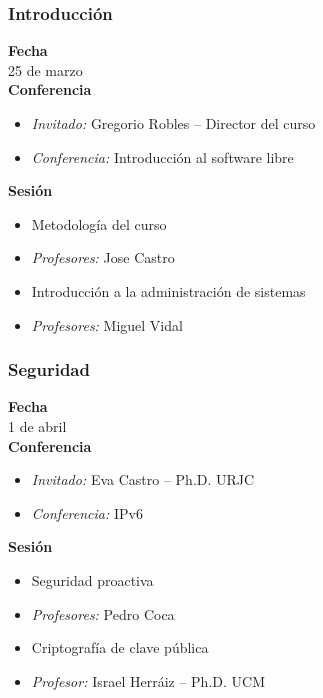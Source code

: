 \documentclass{beamer}
\begin{document}
\begin{frame}
  \frametitle{Introducción}
  \textbf{Fecha}\\
  \hspace{0.3cm}25 de marzo\\
  \textbf{Conferencia}
    \begin{itemize}
      \item \textit{Invitado:} Gregorio Robles -- Director del curso
      \item \textit{Conferencia:} Introducción al software libre
    \end{itemize}
  \textbf{Sesión}
    \begin{itemize}
      \item Metodología del curso
      \item \textit{Profesores:} Jose Castro
    \end{itemize}
    \begin{itemize}
      \item Introducción a la administración de sistemas
      \item \textit{Profesores:} Miguel Vidal
    \end{itemize}
\end{frame}

\begin{frame}
  \frametitle{Seguridad}
  \textbf{Fecha}\\
  \hspace{0.3cm}1 de abril\\
  \textbf{Conferencia}
    \begin{itemize}
      \item \textit{Invitado:} Eva Castro -- Ph.D. URJC
      \item \textit{Conferencia:} IPv6
    \end{itemize}
  \textbf{Sesión}
    \begin{itemize}
      \item Seguridad proactiva
      \item \textit{Profesores:} Pedro Coca 
    \end{itemize}
    \begin{itemize}
      \item Criptografía de clave pública
      \item \textit{Profesor:} Israel Herráiz -- Ph.D. UCM
    \end{itemize}
\end{frame}
\end{document}
